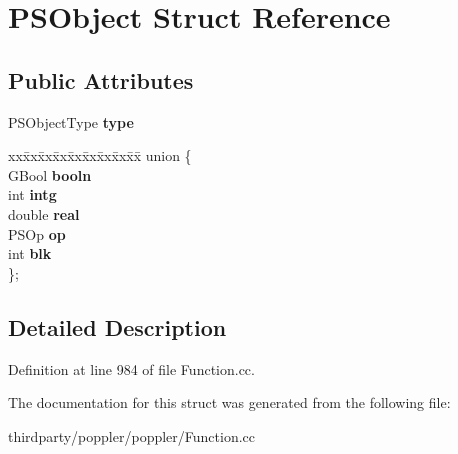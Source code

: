 \hypertarget{struct_p_s_object}{}\section{P\+S\+Object Struct Reference}
\label{struct_p_s_object}
\subsection*{Public Attributes}
\begin{DoxyCompactItemize}
\item 
\mbox{\label{struct_p_s_object_a42d8ffff5c3cbaddfd53c66d3dd3be96}} 
P\+S\+Object\+Type {\bfseries type}
\item 
\mbox{\label{struct_p_s_object_acc57e05fecf571ae49f36b5f89da433a}} 
\begin{tabbing}
xx\=xx\=xx\=xx\=xx\=xx\=xx\=xx\=xx\=\kill
union \{\\
\>GBool {\bfseries booln}\\
\>int {\bfseries intg}\\
\>double {\bfseries real}\\
\>PSOp {\bfseries op}\\
\>int {\bfseries blk}\\
\}; \\

\end{tabbing}\end{DoxyCompactItemize}


\subsection{Detailed Description}


Definition at line 984 of file Function.\+cc.



The documentation for this struct was generated from the following file\+:\begin{DoxyCompactItemize}
\item 
thirdparty/poppler/poppler/Function.\+cc\end{DoxyCompactItemize}
